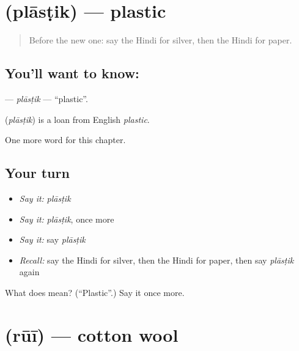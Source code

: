 \section[\texorpdfstring{\hi{प्लास्टिक} (plāsṭik)}{प्लास्टिक (plāsṭik)}]{ (plāsṭik) — plastic}

\label{lesson:HI-C246-plastik}



\begin{quote}
Before the new one: say the Hindi for silver, then the Hindi for paper.
\end{quote}

\subsection*{You'll want to know: }
\textbf{} — \emph{plāsṭik} — \textquotedblleft{}plastic\textquotedblright{}.

\begin{cousinweb}
\textbf{} (\emph{plāsṭik}) is a loan from English \emph{plastic}.
\end{cousinweb}

\begin{grammarlens}[title={What you've built}]
One more word for this chapter.
\end{grammarlens}

\subsection*{Your turn}
\begin{itemize}
\raggedright
  \item \emph{Say it:} \emph{plāsṭik}
  \item \emph{Say it:} \emph{plāsṭik}, once more
  \item \emph{Say it:} say \emph{plāsṭik}
  \item \emph{Recall:} say the Hindi for silver, then the Hindi for paper, then say \emph{plāsṭik} again
\end{itemize}

\begin{tcolorbox}[breakable,colback=teal!4,colframe=teal!35!black,title={Before you move on}]
What does  mean? (\textquotedblleft{}Plastic\textquotedblright{}.) Say it once more.
\end{tcolorbox}
\section[\texorpdfstring{\hi{रुई} (rūī)}{रुई (rūī)}]{ (rūī) — cotton wool}

